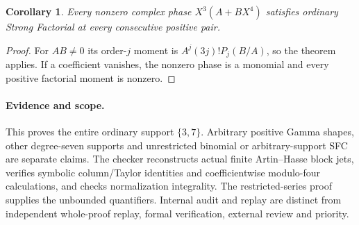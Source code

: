 \documentclass[11pt]{article}
\newtheorem{corollary}{Corollary}
\begin{document}
\begin{corollary}\label{cor:sfc}
Every nonzero complex phase $X^3(A+BX^4)$ satisfies ordinary
Strong Factorial at every consecutive positive pair.
\end{corollary}
\begin{proof}
For $AB\ne0$ its order-$j$ moment is $A^j(3j)!P_j(B/A)$,
so the theorem applies. If a coefficient vanishes, the nonzero
phase is a monomial and every positive factorial moment is nonzero.
\end{proof}

\paragraph{Evidence and scope.}
This proves the entire ordinary support $\{3,7\}$.
Arbitrary positive Gamma shapes, other degree-seven supports and
unrestricted binomial or arbitrary-support SFC are separate claims.
The checker reconstructs actual finite Artin--Hasse block jets,
verifies symbolic column/Taylor identities and coefficientwise
modulo-four calculations, and checks normalization integrality.
The restricted-series proof supplies the unbounded quantifiers.
Internal audit and replay are distinct from independent
whole-proof replay, formal verification, external review and priority.
\end{document}
